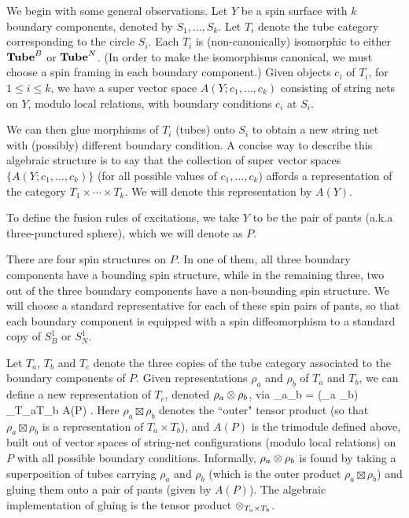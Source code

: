 We begin with some general observations.
Let $Y$ be a spin surface with $k$ boundary components, denoted by $S_1,\ldots,S_k$.
Let $T_i$ denote the tube category corresponding to the circle $S_i$.
Each $T_i$ is (non-canonically) isomorphic to either $\textbf{Tube}^B$ or $\textbf{Tube}^N$.
(In order to make the isomorphisms canonical, we must choose a spin framing in each
boundary component.)
Given objects $c_i$ of $T_i$, for $1\le i \le k$, we have a super vector space $A(Y; c_1,\ldots,c_k)$ consisting of string nets
on $Y$, modulo local relations, with boundary conditions $c_i$ at $S_i$.

We can then glue morphisms of $T_i$ (tubes) onto $S_i$ to obtain a new string net with (possibly) different boundary condition.
A concise way to describe this algebraic structure is to say that the collection of super vector spaces $\{A(Y; c_1,\ldots,c_k)\}$
(for all possible values of $c_1,\ldots,c_k$)
affords a representation of the category $T_1\times\cdots\times T_k$.
We will denote this representation by $A(Y)$.

To define the fusion rules of excitations, we take $Y$ to be the 
pair of pants (a.k.a three-punctured sphere), which we will denote as $P$. 

There are four spin structures on $P$. 
In one of them, all three boundary components have a bounding spin structure, while in 
the remaining three, two out of the three boundary components have a non-bounding spin structure.
We will choose a standard representative for each of these spin pairs of pants, 
so that each boundary component is equipped with a spin diffeomorphism to a 
standard copy of $S^1_B$ or $S^1_N$.

Let $T_a$, $T_b$ and $T_c$ denote the three copies of the tube category associated to the boundary components of $P$.
Given representations $\rho_a$ and $\rho_b$ of $T_a$ and $T_b$, we can define a new representation of $T_c$,
denoted $\rho_a\otimes\rho_b$, via
\be  \label{tctpdef}
	\rho_a\tp\rho_b = (\rho_a \boxtimes \rho_b) \tp_{T_a\times T_b} A(P) .
\ee
Here $\rho_a \boxtimes \rho_b$ denotes the ``outer" tensor product (so that $\rho_a \boxtimes \rho_b$ is a representation of $T_a\times T_b$), 
and $A(P)$ is the 
trimodule defined above, built out of
vector spaces of string-net configurations (modulo local relations) on $P$ with all possible boundary conditions. 
Informally, $\rho_a\otimes \rho_b$ is found by taking a superposition of tubes carrying $\rho_a$ and $\rho_b$ 
(which is the outer product $\rho_a\boxtimes\rho_b$) and gluing them onto a pair of pants (given by $A(P)$). 
The algebraic implementation of gluing is the tensor product $\otimes_{T_a\times T_b}$. 

